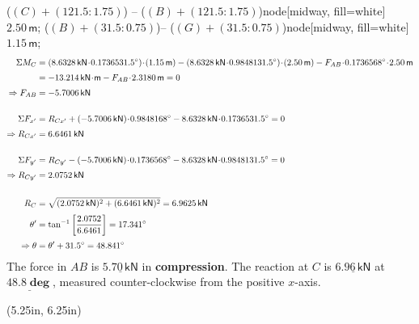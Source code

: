 \documentclass[10pt,oneside]{article}
\begin{document}
\begin{textblock*}{5.75in}
{       ($(C)+(121.5:1.75)$) -- ($(B)+(121.5:1.75)$)node[midway, fill=white]{\small $ 2.50\,\textsf{m} $};
        ($ (B)+(31.5:0.75) $)-- ($ (G)+(31.5:0.75) $)node[midway, fill=white]{\small $ 1.15\,\textsf{m} $};
    }
    \begin{align*}
      \Sigma M_C &= (8.6328\,\textsf{kN}\cd\sin 31.5\deg)\cd(1.15\,\textsf{m})-(8.6328\,\textsf{kN}\cd\cos 31.5\deg)\cd(2.50\,\textsf{m}) - F_{AB}\cd\sin 68\deg\cd 2.50\,\textsf{m} \\[0.25em]
      &= -13.214\,\mathsf{kN\cd m}-F_{AB}\cd 2.3180\,\textsf{m}=0 \\[0.25em]
      \Ra F_{AB} &= -5.7006\,\textsf{kN} \\\\
      \Sigma F_{x'} &= R_{Cx'}+(-5.7006\,\textsf{kN})\cd\cos 68\deg - 8.6328\,\textsf{kN}\cd\sin 31.5\deg = 0 \\[0.25em]
      \Ra R_{Cx'} &= 6.6461\,\textsf{kN}\\\\
      \Sigma F_{y'} &= R_{Cy'}-(-5.7006\,\textsf{kN})\cd\sin 68\deg - 8.6328\,\textsf{kN}\cd\cos 31.5\deg = 0 \\[0.25em] 
      \Ra R_{Cy'} &= 2.0752\,\textsf{kN}\\\\
      R_C &= \sqrt{(2.0752\,\textsf{kN})^2+(6.6461\,\textsf{kN})^2} = 6.9625\,\textsf{kN}\\[0.25em]
      \theta ' &= \tan^{-1}\left[\frac{2.0752}{6.6461}\right] = 17.341\deg \\[0.25em]
      \Ra \theta &= \theta ' + 31.5\deg = 48.841\deg
    \end{align*}
    	\parb\large\centering
      The force in $AB$ is $\underline{\bm{5.70\,\mathsf{kN}}}$ in {\bf compression}.      
      \parm      
      The reaction at $C$ is $\underline{\bm{6.96\,\mathsf{kN}}}$ at  $\underline{\bm{48.8\deg}}$, measured counter-clockwise from the positive $x$-axis.

\end{textblock*}

\begin{textblock*}{3in}(5.25in, 6.25in)
  \centering
\end{textblock*}
\end{document}
